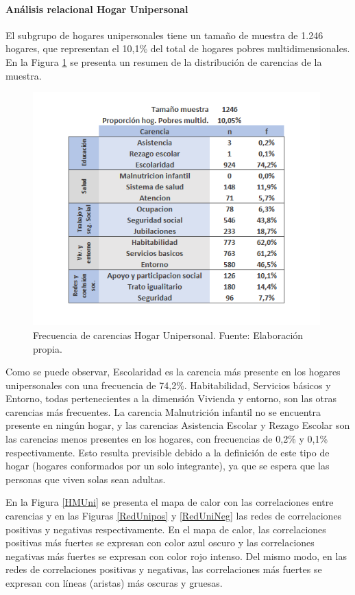 \documentclass[12pt,letterpaper,spanish]{article}
\begin{document}
\paragraph{Análisis relacional Hogar Unipersonal}

El subgrupo de hogares unipersonales tiene un tamaño de muestra de 1.246 hogares, que representan el 10,1\% del total de hogares pobres multidimensionales. En la Figura \ref{freHUni} se presenta un resumen de la distribución de carencias de la muestra.
\begin{figure}[H]
    \centering
        \includegraphics[height=9cm]{HOGARES/tabla_unip.png}
    \caption{Frecuencia de carencias Hogar Unipersonal. Fuente: Elaboración propia.}
    \label{freHUni}
\end{figure}
Como se puede observar, Escolaridad es la carencia más presente en los hogares unipersonales con una frecuencia de 74,2\%. Habitabilidad, Servicios básicos y Entorno, todas pertenecientes a la dimensión Vivienda y entorno, son las otras carencias más frecuentes. La carencia Malnutrición infantil no se encuentra presente en ningún hogar, y las carencias Asistencia Escolar y Rezago Escolar son las carencias menos presentes en los hogares, con frecuencias de 0,2\% y 0,1\% respectivamente. Esto resulta previsible debido a la definición de este tipo de hogar (hogares conformados por un solo integrante), ya que se espera que las personas que viven solas sean adultas. 

En la Figura \ref{HMUni} se presenta el mapa de calor con las correlaciones entre carencias y en las Figuras \ref{RedUnipos} y \ref{RedUniNeg} las redes de correlaciones positivas y negativas respectivamente.
En el mapa de calor, las correlaciones positivas más fuertes se expresan con color azul oscuro y las correlaciones negativas más fuertes se expresan con color rojo intenso. Del mismo modo, en las redes de correlaciones positivas y negativas, las correlaciones más fuertes se expresan con líneas (aristas) más oscuras y gruesas.
\end{document}

